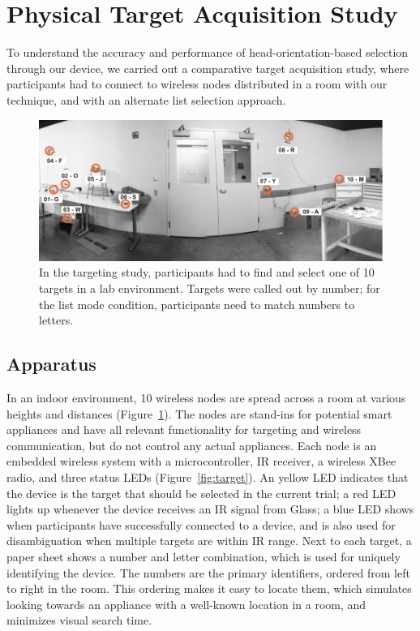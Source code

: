 \section{Physical Target Acquisition Study}
To understand the accuracy and performance of head-orientation-based  selection through our device, we carried out a comparative target acquisition study, where participants had to connect to wireless nodes distributed in a room with our technique, and with an alternate list selection approach.

\begin{figure}[t]
\centering
\includegraphics[width=1.0\columnwidth]{figures/targeting-study-layout.pdf}
\caption{In the targeting study, participants had to find and select one of 10 targets in a lab environment. Targets were called out by number; for the list mode condition, participants need to match numbers to letters.}
\label{fig:targeting-study-layout}
\end{figure}

\subsection{Apparatus}
In an indoor environment, 10 wireless nodes are spread across a room at various heights and distances (Figure~\ref{fig:targeting-study-layout}). The nodes are stand-ins for potential smart appliances and have all relevant functionality for targeting and wireless communication, but do not control any actual appliances. Each node is an embedded wireless system with a microcontroller, IR receiver, a wireless XBee radio, and three status LEDs (Figure~\ref{fig:target}). An yellow LED indicates that the device is the target that should be selected in the current trial; a red LED lights up whenever the device receives an IR signal from Glass; a blue LED shows when participants have successfully connected to a device, and is also used for disambiguation when multiple targets are within IR range. Next to each target, a paper sheet shows a number and letter combination, which is used for uniquely identifying the device. The numbers are the primary identifiers, ordered from left to right in the room. This ordering makes it easy to locate them, which simulates looking towards an appliance with a well-known location in a room, and minimizes visual search time.

